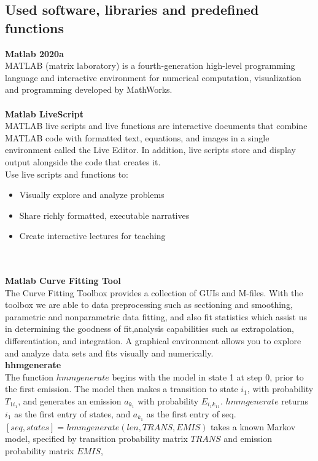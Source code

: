 \subsection{Used software, libraries and predefined functions} \label{subsec:libraries}
\textbf{Matlab 2020a}\\
MATLAB (matrix laboratory) is a fourth-generation high-level programming language and interactive environment for numerical
computation, visualization and programming developed by MathWorks.\\
\\
\textbf{Matlab LiveScript}~\cite{livescript}\\
MATLAB live scripts and live functions are interactive documents that combine MATLAB code with formatted text, equations,
and images in a single environment called the Live Editor.
In addition, live scripts store and display output alongside the code that creates it.\\
Use live scripts and functions to:\\
\begin{itemize}
    \item Visually explore and analyze problems
    \item Share richly formatted, executable narratives
    \item Create interactive lectures for teaching
\end{itemize}\\
\\
\textbf{Matlab Curve Fitting Tool}\\
The Curve Fitting Toolbox provides a collection of GUIs and M-files.
With the toolbox we are able to data preprocessing such as sectioning and smoothing, parametric and nonparametric data fitting,
and also fit statistics which assist us in determining the goodness of fit,analysis capabilities such as extrapolation, differentiation, and integration.
A graphical environment allows you to explore and analyze data sets and fits visually and numerically.\\
\textbf{hhmgenerate}~\cite{hhmgenerate}\\
The function $hmmgenerate$ begins with the model in state 1 at step 0, prior to the first emission.
The model then makes a transition to state $i_1$, with probability $T_{1i_1}$, and generates an emission $a_k_1$ with probability $E_{i_1k_11}$.
$hmmgenerate$ returns $i_1$ as the first entry of states, and $a_k_1$ as the first entry of seq.
$[seq,states] = hmmgenerate(len,TRANS,EMIS)$ takes a known Markov model, specified by transition probability matrix $TRANS$ and emission probability matrix $EMIS$,
